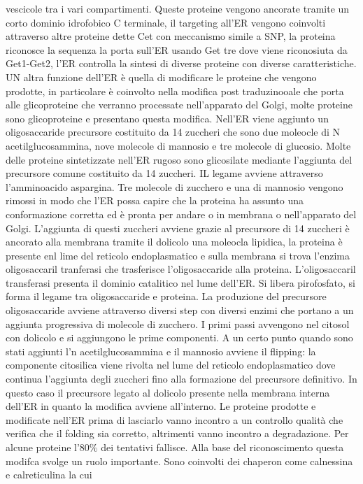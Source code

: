 vescicole tra i vari compartimenti. Queste proteine vengono ancorate tramite un corto dominio idrofobico C terminale, il targeting all'ER vengono coinvolti attraverso altre proteine 
dette Cet con meccanismo simile a SNP, la proteina riconosce la sequenza la porta sull'ER usando Get tre dove viene riconosiuta da Get1-Get2, l'ER controlla la sintesi di diverse proteine
con diverse caratteristiche. UN altra funzione dell'ER \`e quella di modificare le proteine che vengono prodotte, in particolare \`e coinvolto nella modifica post traduzinooale che porta
alle glicoproteine che verranno processate nell'apparato del Golgi, molte proteine sono glicoproteine e presentano questa modifica. Nell'ER viene aggiunto un oligosaccaride precursore
costituito da 14 zuccheri che sono due moleocle di N acetilglucosammina, nove molecole di mannosio e tre molecole di glucosio. Molte delle proteine sintetizzate nell'ER rugoso sono
glicosilate mediante l'aggiunta del precursore comune costituito da 14 zuccheri. IL legame avviene attraverso l'amminoacido aspargina. Tre molecole di zucchero e una di mannosio vengono
rimossi in modo che l'ER possa capire che la proteina ha assunto una conformazione corretta ed \`e pronta per andare o in membrana o nell'apparato del Golgi. L'aggiunta di questi 
zuccheri avviene grazie al precursore di 14 zuccheri \`e ancorato alla membrana tramite il dolicolo una moleocla lipidica, la proteina \`e presente enl lime del reticolo endoplasmatico
e sulla membrana si trova l'enzima oligosaccaril tranferasi che trasferisce l'oligosaccaride alla proteina. L'oligosaccaril transferasi presenta il dominio catalitico nel lume dell'ER. 
Si libera pirofosfato, si forma il legame tra oligosaccaride e proteina. La produzione del precursore oligosaccaride avviene attraverso diversi step con diversi enzimi che portano a
un aggiunta progressiva di molecole di zucchero. I primi passi avvengono nel citosol con dolicolo e si aggiungono le prime componenti. A un certo punto quando sono stati aggiunti l'n 
acetilglucosammina e il mannosio avviene il flipping: la componente citosilica viene rivolta nel lume del reticolo endoplasmatico dove continua l'aggiunta degli zuccheri fino alla
formazione del precursore definitivo. In questo caso il precursore legato al dolicolo presente nella membrana interna dell'ER in quanto la modifica avviene all'interno. Le proteine
prodotte e modificate nell'ER prima di lasciarlo vanno incontro a un controllo qualit\`a che verifica che il folding sia corretto, altrimenti vanno incontro a degradazione. Per alcune
proteine l'$80\%$ dei tentativi fallisce. Alla base del riconoscimento questa modifca svolge un ruolo importante. Sono coinvolti dei chaperon come calnessina e calreticulina la cui
